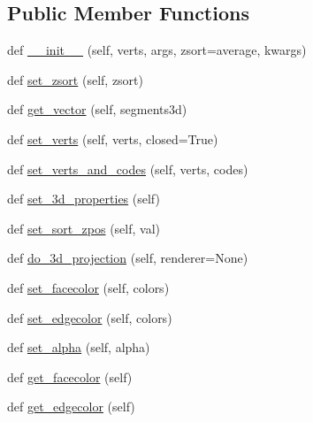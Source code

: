 \subsection*{Public Member Functions}
\begin{DoxyCompactItemize}
\item 
def \hyperlink{classmplot3d_1_1art3d_1_1Poly3DCollection_a7cec4a76a7d728f590eff00292460ae6}{\+\_\+\+\_\+init\+\_\+\+\_\+} (self, verts, args, zsort=\textquotesingle{}average\textquotesingle{}, kwargs)
\item 
def \hyperlink{classmplot3d_1_1art3d_1_1Poly3DCollection_a8a955218bbd6c7d19ec8ab69befd69c7}{set\+\_\+zsort} (self, zsort)
\item 
def \hyperlink{classmplot3d_1_1art3d_1_1Poly3DCollection_a9b668fe020177bdde177216bfb3b01ee}{get\+\_\+vector} (self, segments3d)
\item 
def \hyperlink{classmplot3d_1_1art3d_1_1Poly3DCollection_a10a18953be3d095e01b3174e90d06f07}{set\+\_\+verts} (self, verts, closed=True)
\item 
def \hyperlink{classmplot3d_1_1art3d_1_1Poly3DCollection_a111d19bcfc683c59c952959d06c65168}{set\+\_\+verts\+\_\+and\+\_\+codes} (self, verts, codes)
\item 
def \hyperlink{classmplot3d_1_1art3d_1_1Poly3DCollection_a11f9ca81d9f5964d4da9c123003b4e7d}{set\+\_\+3d\+\_\+properties} (self)
\item 
def \hyperlink{classmplot3d_1_1art3d_1_1Poly3DCollection_a4484ae943f6159ab6c86db99d42ccc15}{set\+\_\+sort\+\_\+zpos} (self, val)
\item 
def \hyperlink{classmplot3d_1_1art3d_1_1Poly3DCollection_a15ea0337f78c6885b621ffff20748afd}{do\+\_\+3d\+\_\+projection} (self, renderer=None)
\item 
def \hyperlink{classmplot3d_1_1art3d_1_1Poly3DCollection_a118a39301661fed37da5052d17f9df04}{set\+\_\+facecolor} (self, colors)
\item 
def \hyperlink{classmplot3d_1_1art3d_1_1Poly3DCollection_a5b6268d430e252ab54a7f0c29b098d56}{set\+\_\+edgecolor} (self, colors)
\item 
def \hyperlink{classmplot3d_1_1art3d_1_1Poly3DCollection_a69ce77b322761d15316cfb8c3ec06a8b}{set\+\_\+alpha} (self, alpha)
\item 
def \hyperlink{classmplot3d_1_1art3d_1_1Poly3DCollection_afb7ce9c83609e38ea2cb8c6321d2ee9e}{get\+\_\+facecolor} (self)
\item 
def \hyperlink{classmplot3d_1_1art3d_1_1Poly3DCollection_ac4741cb0e74c11c625d05a629f29d138}{get\+\_\+edgecolor} (self)
\end{DoxyCompactItemize}
